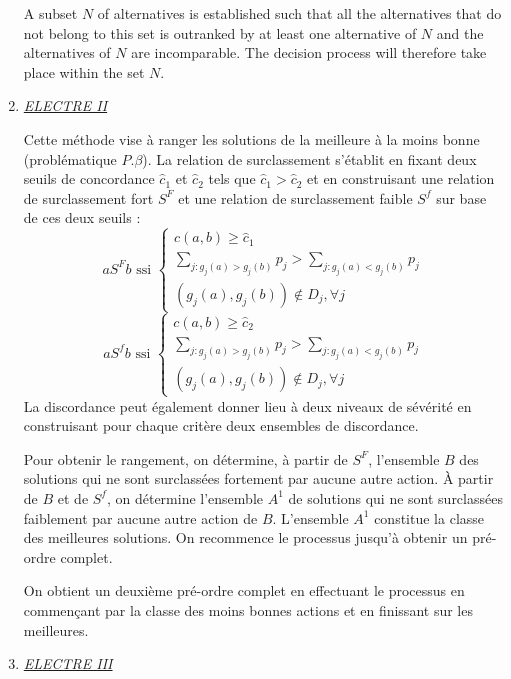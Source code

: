 \begin{enumerate}
A subset $N$ of alternatives is established such that all the alternatives that do not belong to this set is outranked by at least one alternative of $N$ and the alternatives of $N$ are incomparable. The decision process will therefore take place within the set $N$.

\item \textit{\underline{ELECTRE II}}

Cette méthode vise à ranger les solutions de la meilleure à la moins bonne (problématique $P.\beta$). La relation de surclassement s'établit en fixant deux seuils de concordance $\hat{c}_{1}$ et $\hat{c}_{2}$ tels que $\hat{c}_{1} > \hat{c}_{2}$ et en construisant une relation de surclassement fort $S^{F}$ et une relation de surclassement faible $S^{f}$ sur base de ces deux seuils :
\begin{equation}
aS^{F}b \text{ ssi } \begin{cases}
	c(a, b) \geq \hat{c}_{1}\\
	\sum_{j : g_{j}(a)>g_{j}(b)} p_{j} > \sum_{j : g_{j}(a)<g_{j}(b)} p_{j}\\
	(g_{j}(a), g_{j}(b)) \not\in D_{j}, \forall j
	\end{cases}
\end{equation}
\begin{equation}
aS^{f}b \text{ ssi } \begin{cases}
	c(a, b) \geq \hat{c}_{2}\\
	\sum_{j : g_{j}(a)>g_{j}(b)} p_{j} > \sum_{j : g_{j}(a)<g_{j}(b)} p_{j}\\
	(g_{j}(a), g_{j}(b)) \not\in D_j, \forall j
	\end{cases}
\end{equation}
La discordance peut également donner lieu à deux niveaux de sévérité en construisant pour chaque critère deux ensembles de discordance.

Pour obtenir le rangement, on détermine, à partir de $S^ {F}$, l'ensemble $B$ des solutions qui ne sont surclassées fortement par aucune autre action. À partir de $B$ et de $S^{f}$, on détermine l'ensemble $A^{1}$ de solutions qui ne sont surclassées faiblement par aucune autre action de $B$. L'ensemble $A^{1}$ constitue la classe des meilleures solutions. On recommence le processus jusqu'à obtenir un pré-ordre complet.

On obtient un deuxième pré-ordre complet en effectuant le processus en commençant par la classe des moins bonnes actions et en finissant sur les meilleures.

\item \textit{\underline{ELECTRE III}}


\end{enumerate}
